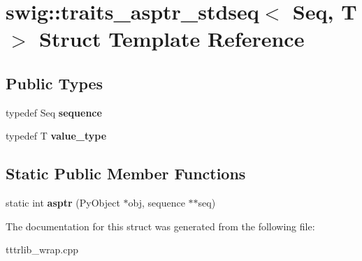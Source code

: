 \hypertarget{structswig_1_1traits__asptr__stdseq}{}\section{swig\+:\+:traits\+\_\+asptr\+\_\+stdseq$<$ Seq, T $>$ Struct Template Reference}
\label{structswig_1_1traits__asptr__stdseq}
\subsection*{Public Types}
\begin{DoxyCompactItemize}
\item 
\mbox{\label{structswig_1_1traits__asptr__stdseq_acc3237a1f41e649f169c938930068a35}} 
typedef Seq {\bfseries sequence}
\item 
\mbox{\label{structswig_1_1traits__asptr__stdseq_a18bb424b58bc29aa995ff6d246499ee5}} 
typedef T {\bfseries value\+\_\+type}
\end{DoxyCompactItemize}
\subsection*{Static Public Member Functions}
\begin{DoxyCompactItemize}
\item 
\mbox{\label{structswig_1_1traits__asptr__stdseq_a20c63611de0e0b36a51bf9b1ff41af48}} 
static int {\bfseries asptr} (Py\+Object $\ast$obj, sequence $\ast$$\ast$seq)
\end{DoxyCompactItemize}


The documentation for this struct was generated from the following file\+:\begin{DoxyCompactItemize}
\item 
tttrlib\+\_\+wrap.\+cpp\end{DoxyCompactItemize}
